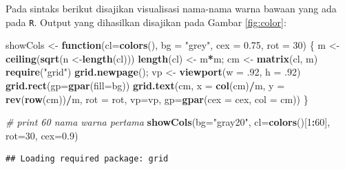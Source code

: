 \documentclass[]{book}
\newenvironment{Shaded}{\begin{snugshade}}{\end{snugshade}}
\newcommand{\KeywordTok}[1]{\textcolor[rgb]{0.13,0.29,0.53}{\textbf{#1}}}
\newcommand{\DataTypeTok}[1]{\textcolor[rgb]{0.13,0.29,0.53}{#1}}
\newcommand{\DecValTok}[1]{\textcolor[rgb]{0.00,0.00,0.81}{#1}}
\newcommand{\FloatTok}[1]{\textcolor[rgb]{0.00,0.00,0.81}{#1}}
\newcommand{\StringTok}[1]{\textcolor[rgb]{0.31,0.60,0.02}{#1}}
\newcommand{\CommentTok}[1]{\textcolor[rgb]{0.56,0.35,0.01}{\textit{#1}}}
\newcommand{\ControlFlowTok}[1]{\textcolor[rgb]{0.13,0.29,0.53}{\textbf{#1}}}
\newcommand{\OperatorTok}[1]{\textcolor[rgb]{0.81,0.36,0.00}{\textbf{#1}}}
\newcommand{\NormalTok}[1]{#1}
\begin{document}
Pada sintaks berikut disajikan visualisasi nama-nama warna bawaan yang
ada pada \texttt{R}. Output yang dihasilkan disajikan pada Gambar
\ref{fig:color}:

\begin{Shaded}
\begin{Highlighting}[]
\NormalTok{showCols <-}\StringTok{ }\ControlFlowTok{function}\NormalTok{(}\DataTypeTok{cl=}\KeywordTok{colors}\NormalTok{(), }\DataTypeTok{bg =} \StringTok{"grey"}\NormalTok{,}
                     \DataTypeTok{cex =} \FloatTok{0.75}\NormalTok{, }\DataTypeTok{rot =} \DecValTok{30}\NormalTok{) \{}
\NormalTok{    m <-}\StringTok{ }\KeywordTok{ceiling}\NormalTok{(}\KeywordTok{sqrt}\NormalTok{(n <-}\KeywordTok{length}\NormalTok{(cl)))}
    \KeywordTok{length}\NormalTok{(cl) <-}\StringTok{ }\NormalTok{m}\OperatorTok{*}\NormalTok{m; cm <-}\StringTok{ }\KeywordTok{matrix}\NormalTok{(cl, m)}
    \KeywordTok{require}\NormalTok{(}\StringTok{"grid"}\NormalTok{)}
    \KeywordTok{grid.newpage}\NormalTok{(); vp <-}\StringTok{ }\KeywordTok{viewport}\NormalTok{(}\DataTypeTok{w =}\NormalTok{ .}\DecValTok{92}\NormalTok{, }\DataTypeTok{h =}\NormalTok{ .}\DecValTok{92}\NormalTok{)}
    \KeywordTok{grid.rect}\NormalTok{(}\DataTypeTok{gp=}\KeywordTok{gpar}\NormalTok{(}\DataTypeTok{fill=}\NormalTok{bg))}
    \KeywordTok{grid.text}\NormalTok{(cm, }\DataTypeTok{x =} \KeywordTok{col}\NormalTok{(cm)}\OperatorTok{/}\NormalTok{m, }\DataTypeTok{y =} \KeywordTok{rev}\NormalTok{(}\KeywordTok{row}\NormalTok{(cm))}\OperatorTok{/}\NormalTok{m, }\DataTypeTok{rot =}\NormalTok{ rot,}
              \DataTypeTok{vp=}\NormalTok{vp, }\DataTypeTok{gp=}\KeywordTok{gpar}\NormalTok{(}\DataTypeTok{cex =}\NormalTok{ cex, }\DataTypeTok{col =}\NormalTok{ cm))}
\NormalTok{\}}

\CommentTok{# print 60 nama warna pertama}
\KeywordTok{showCols}\NormalTok{(}\DataTypeTok{bg=}\StringTok{"gray20"}\NormalTok{, }\DataTypeTok{cl=}\KeywordTok{colors}\NormalTok{()[}\DecValTok{1}\OperatorTok{:}\DecValTok{60}\NormalTok{], }\DataTypeTok{rot=}\DecValTok{30}\NormalTok{, }\DataTypeTok{cex=}\FloatTok{0.9}\NormalTok{)}
\end{Highlighting}
\end{Shaded}

\begin{verbatim}
## Loading required package: grid
\end{verbatim}
\end{document}

